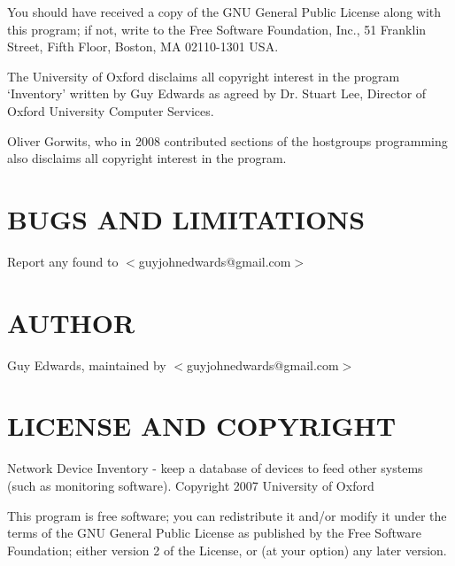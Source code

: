\documentclass{book}
\begin{document}
You should have received a copy of the GNU General Public License along with this program; if not, write to the Free Software Foundation, Inc., 51 Franklin Street, Fifth Floor, Boston, MA 02110-1301 USA.



The University of Oxford disclaims all copyright interest in the program `Inventory' written by Guy Edwards as agreed by Dr. Stuart Lee, Director of Oxford University Computer Services.



Oliver Gorwits, who in 2008 contributed sections of the hostgroups programming also disclaims all copyright interest in the program.




\section{BUGS AND LIMITATIONS}
\label{_BUGS_AND_LIMITATIONS}
\hypertarget{_BUGS_AND_LIMITATIONS}{}



Report any found to $<$guyjohnedwards@gmail.com$>$


\section{AUTHOR}
\label{_AUTHOR}
\hypertarget{_AUTHOR}{}



Guy Edwards, maintained by $<$guyjohnedwards@gmail.com$>$


\section{LICENSE AND COPYRIGHT}
\label{_LICENSE_AND_COPYRIGHT}
\hypertarget{_LICENSE_AND_COPYRIGHT}{}



Network Device Inventory - keep a database of devices to feed other systems (such as monitoring software). Copyright 2007 University of Oxford



This program is free software; you can redistribute it and/or modify it under the terms of the GNU General Public License as published by the Free Software Foundation; either version 2 of the License, or (at your option) any later version.
\end{document}
